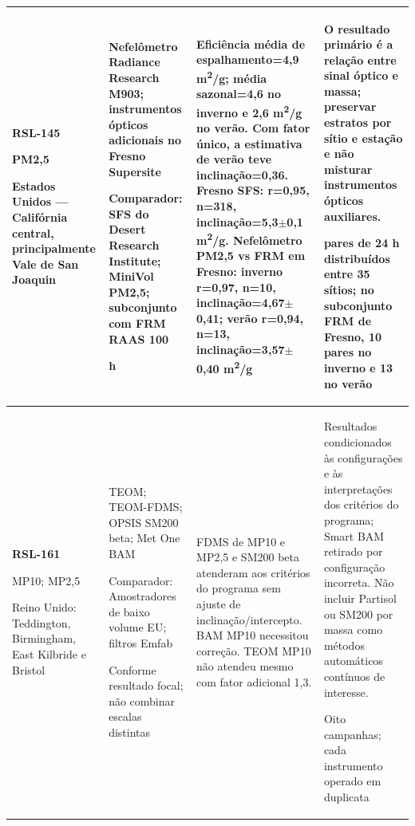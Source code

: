 \begin{longtable}{|P{0.18\textwidth}|P{0.25\textwidth}|P{0.28\textwidth}|P{\arrayrulewidth\relax}|}
\textbf{RSL-145}\par\textcite{rsl145}\par PM2,5\par Estados Unidos --- Califórnia central, principalmente Vale de San Joaquin & Nefelômetro Radiance Research M903; instrumentos ópticos adicionais no Fresno Supersite\par\medskip Comparador: SFS do Desert Research Institute; MiniVol PM2,5; subconjunto com FRM RAAS 100\par{} h & Eficiência média de espalhamento=4,9 m\textsuperscript{2}/g; média sazonal=4,6 no inverno e 2,6 m\textsuperscript{2}/g no verão. Com fator único, a estimativa de verão teve inclinação=0,36. Fresno SFS: r=0,95, n=318, inclinação=5,3\ensuremath{\pm}0,1 m\textsuperscript{2}/g. Nefelômetro PM2,5 vs FRM em Fresno: inverno r=0,97, n=10, inclinação=4,67\ensuremath{\pm}0,41; verão r=0,94, n=13, inclinação=3,57\ensuremath{\pm}0,40 m\textsuperscript{2}/g & O resultado primário é a relação entre sinal óptico e massa; preservar estratos por sítio e estação e não misturar instrumentos ópticos auxiliares.\par{} pares de 24 h distribuídos entre 35 sítios; no subconjunto FRM de Fresno, 10 pares no inverno e 13 no verão\\\hline
\textbf{RSL-161}\par\textcite{rsl161}\par MP10; MP2,5\par Reino Unido: Teddington, Birmingham, East Kilbride e Bristol & TEOM; TEOM-FDMS; OPSIS SM200 beta; Met One BAM\par\medskip Comparador: Amostradores de baixo volume EU; filtros Emfab\par\medskip Conforme resultado focal; não combinar escalas distintas & FDMS de MP10 e MP2,5 e SM200 beta atenderam aos critérios do programa sem ajuste de inclinação/intercepto. BAM MP10 necessitou correção. TEOM MP10 não atendeu mesmo com fator adicional 1,3. & Resultados condicionados às configurações e às interpretações dos critérios do programa; Smart BAM retirado por configuração incorreta. Não incluir Partisol ou SM200 por massa como métodos automáticos contínuos de interesse.\par\medskip Oito campanhas; cada instrumento operado em duplicata\\\hline

\end{longtable}

